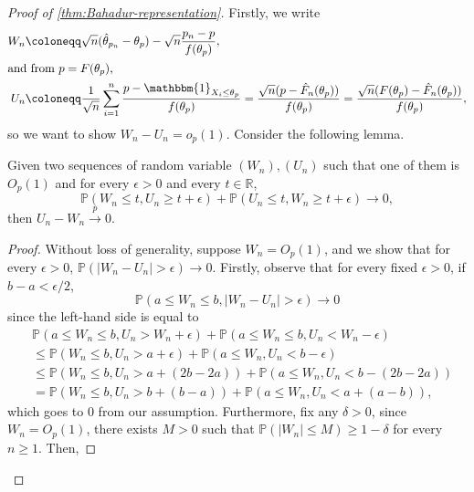 \begin{proof}[Proof of \autoref{thm:Bahadur-representation}]\label{pf:Bahadur-representation}
	Firstly, we write
	\begin{align*}
		W_n
		 & \coloneqq \sqrt{n} (\hat{\theta} _{p_n} - \theta _p) - \sqrt{n} \frac{p_n - p}{f(\theta _p)} ,          \\
		\shortintertext{and from \(p = F(\theta _p)\),}
		U_n
		 & \coloneqq \frac{1}{\sqrt{n} } \sum_{i=1}^{n} \frac{p - \mathbbm{1}_{X_i \leq \theta _p} }{f(\theta _p)}
		= \frac{\sqrt{n} (p - \hat{F} _n (\theta _p))}{f(\theta _p)}
		= \frac{\sqrt{n} (F(\theta _p) - \hat{F} _n(\theta _p))}{f(\theta _p)},
	\end{align*}
	so we want to show \(W_n - U_n = o_p(1)\). Consider the following lemma.

	\begin{lemma}\label{lma:Bahadur-representation}
		Given two sequences of random variable \((W_n), (U_n)\) such that one of them is \(O_p(1)\) and for every \(\epsilon > 0\) and every \(t \in \mathbb{R} \),
		\[
			\mathbb{P} (W_n \leq t, U_n \geq t+\epsilon ) + \mathbb{P} (U_n \leq t, W_n \geq t + \epsilon ) \to 0,
		\]
		then \(U_n - W_n \overset{p}{\to} 0\).
	\end{lemma}
	\begin{proof}
		Without loss of generality, suppose \(W_n = O_p(1)\), and we show that for every \(\epsilon > 0\), \(\mathbb{P} (\vert W_n - U_n \vert > \epsilon ) \to 0\). Firstly, observe that for every fixed \(\epsilon > 0\), if \(b - a < \epsilon / 2\),
		\[
			\mathbb{P} (a \leq W_n \leq b , \vert W_n - U_n \vert > \epsilon ) \to 0
		\]
		since the left-hand side is equal to
		\[
			\begin{split}
				 & \mathbb{P} (a \leq W_n \leq b, U_n > W_n + \epsilon ) + \mathbb{P} (a \leq W_n \leq b, U_n < W_n - \epsilon ) \\
				 & \leq \mathbb{P} (W_n \leq b, U_n > a + \epsilon ) + \mathbb{P} (a \leq W_n , U_n < b - \epsilon )             \\
				 & \leq \mathbb{P} (W_n \leq b, U_n > a + (2b - 2a) ) + \mathbb{P} (a \leq W_n , U_n < b - (2b - 2a) )           \\
				 & = \mathbb{P} (W_n \leq b, U_n > b + (b - a) ) + \mathbb{P} (a \leq W_n , U_n < a + (a - b) ),
			\end{split}
		\]
		which goes to \(0\) from our assumption. Furthermore, fix any \(\delta > 0\), since \(W_n = O_p(1)\), there exists \(M > 0\) such that \(\mathbb{P} (\vert W_n \vert \leq M) \geq 1 - \delta \) for every \(n \geq 1\). Then,

\end{proof}
\end{proof}
